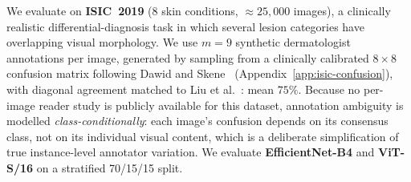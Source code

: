 \documentclass[10pt,journal,compsoc]{IEEEtran}
\begin{document}
We evaluate on \textbf{ISIC~2019} \cite{tschandl2018ham10000,combalia2019bcn} (8 skin conditions, ${\approx}25{,}000$ images), a clinically realistic differential-diagnosis task in which several lesion categories have overlapping visual morphology.  We use $m=9$ synthetic dermatologist annotations per image, generated by sampling from a clinically calibrated $8\times8$ confusion matrix following Dawid and Skene~\cite{dawid1979maximum} (Appendix~\ref{app:isic-confusion}), with diagonal agreement matched to Liu et al.~\cite{liu2020deep}: mean $75\%$.  Because no per-image reader study is publicly available for this dataset, annotation ambiguity is modelled \emph{class-conditionally}: each image's confusion depends on its consensus class, not on its individual visual content, which is a deliberate simplification of true instance-level annotator variation.  We evaluate \textbf{EfficientNet-B4} \cite{tan2019efficientnet} and \textbf{ViT-S/16} \cite{dosovitskiy2021image} on a stratified 70/15/15 split.
\end{document}
